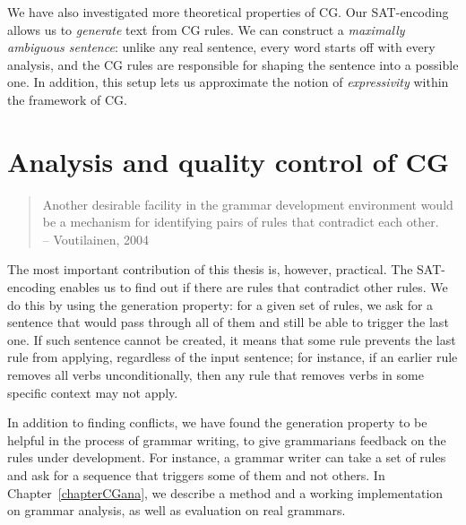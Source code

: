 We have also investigated more theoretical properties of CG.
Our SAT-encoding allows us to \emph{generate} text from CG rules.
We can construct a \emph{maximally ambiguous sentence}: unlike any real sentence, 
every word starts off with every analysis, and the CG rules are responsible for shaping the sentence into a possible one. 
In addition, this setup lets us approximate the notion of \emph{expressivity} within the framework of CG.



\section{Analysis and quality control of CG}

\begin{quote}
Another desirable facility in the grammar development environment would be a mechanism for identifying pairs of rules that contradict each other. \\
-- Voutilainen, 2004
\end{quote}

The most important contribution of this thesis is, however, practical. 
The SAT-encoding enables us to find out if there are rules that contradict other rules. 
We do this by using the generation property: for a given set of rules, we ask for a sentence that would pass through all of them and still be able to trigger the last one. 
If such sentence cannot be created, it means that some rule prevents the last rule from applying, regardless of the input sentence; for instance, if an earlier rule removes all verbs unconditionally, then any rule that removes verbs in some specific context may not apply. 

In addition to finding conflicts, we have found the generation property to be helpful in the process of grammar writing, 
to give grammarians feedback on the rules under development.
For instance, a grammar writer can take a set of rules and ask for a sequence that triggers some of them and not others.
In Chapter~\ref{chapterCGana}, we describe a method and a working 
implementation on grammar analysis, as well as evaluation on real grammars. 







